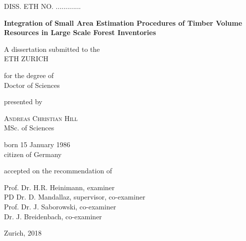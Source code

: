 

\begin{titlepage}

\begin{center}

\textsc{DISS. ETH NO. .............}

\vspace*{2cm}
\Large
\textbf{Integration of Small Area Estimation Procedures of Timber Volume Resources in Large Scale Forest Inventories}

\vspace*{1cm}
A dissertation submitted to the \\
ETH ZURICH

\vspace*{1cm}
for the degree of \\
Doctor of Sciences

\vspace*{1cm}
presented by

\vspace*{0.5cm}
\textsc{Andreas Christian Hill} \\
MSc. of Sciences

\vspace*{0.5cm}
born 15 January 1986 \\
citizen of Germany

\vspace*{1cm}
accepted on the recommendation of

\vspace*{0.2cm}
Prof. Dr. H.R. Heinimann, examiner\\
PD Dr. D. Mandallaz, supervisor, co-examiner\\
Prof. Dr. J. Saborowski, co-examiner\\
Dr. J. Breidenbach, co-examiner

\vspace{3cm}
Zurich, 2018


\end{center}

\end{titlepage}